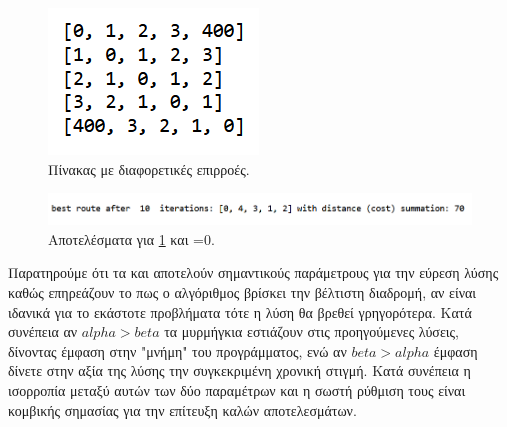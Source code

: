 \begin{figure}
    \centering
    \includegraphics[scale=1]{2947_thesis/pictures/pheromone.png} 
    \caption{Πίνακας  με διαφορετικές επιρροές.}
    \label{15}
\end{figure}
\begin{figure}
    \centering
    \includegraphics[scale=0.65]{2947_thesis/pictures/ex3.png} 
    \caption{Αποτελέσματα για  \ref{15} και =0.}
    \label{16}
\end{figure}
Παρατηρούμε ότι τα  και  αποτελούν σημαντικούς παράμετρους για την εύρεση λύσης καθώς επηρεάζουν το πως ο αλγόριθμος βρίσκει την βέλτιστη διαδρομή, αν είναι ιδανικά  για το εκάστοτε προβλήματα τότε η λύση θα βρεθεί γρηγορότερα. Κατά συνέπεια αν $alpha>beta$ τα μυρμήγκια εστιάζουν στις προηγούμενες λύσεις, δίνοντας έμφαση στην "μνήμη" του προγράμματος, ενώ αν $beta>alpha$ έμφαση δίνετε στην αξία της λύσης την συγκεκριμένη χρονική στιγμή. Κατά συνέπεια η ισορροπία μεταξύ αυτών των δύο παραμέτρων και η σωστή ρύθμιση τους είναι κομβικής σημασίας για την επίτευξη καλών αποτελεσμάτων. 



